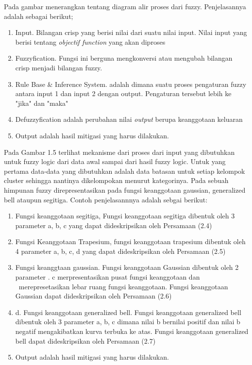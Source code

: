 \documentclass[11pt]{article}
\begin{document}
Pada gambar menerangkan tentang diagram alir proses dari fuzzy. Penjelasannya adalah sebagai berikut;
\begin{enumerate}[label=\alph*.]
	\item Input. Bilangan crisp yang berisi nilai dari suatu nilai input. Nilai input yang berisi tentang \textit{objectif function} yang akan diproses
	\item Fuzzyfication. Fungsi ini berguna mengkonversi atau mengubah bilangan crisp menjadi bilangan fuzzy.
	\item Rule Base \& Inference System. adalah dimana suatu proses pengaturan fuzzy antara input 1 dan input 2 dengan output. Pengaturan tersebut lebih ke "jika" dan "maka"
	\item Defuzzyfication adalah perubahan nilai \textit{output} berupa keanggotaan keluaran
	\item Output adalah hasil mitigasi yang harus dilakukan.
\end{enumerate}
Pada Gambar 1.5 terlihat mekanisme dari proses dari input yang dibutuhkan untuk fuzzy logic dari data awal sampai dari hasil fuzzy logic.
Untuk yang pertama data-data yang dibutuhkan adalah data batasan untuk setiap kelompok cluster sehingga nantinya dikelompokan menurut kategorinya.
Pada sebuah himpunan fuzzy  direpresentasikan pada fungsi keanggotaan gaussian, generalized bell ataupun segitiga.
Contoh penjelasannnya adalah sebgai berikut:
\begin{enumerate}[label=\alph*.]
	\item Fungsi keanggotaan segitiga, Fungsi  keanggotaan  segitiga dibentuk oleh 3 parameter  {a, b, c} yang dapat dideskripsikan oleh Persamaan (2.4)
	\item Fungsi Keanggotaan Trapesium, fungsi keanggotaan trapesium dibentuk oleh 4 parameter {a, b, c, d} yang dapat dideskripsikan oleh Persamaan (2.5)
	\item Fungsi keanggtaan gaussian. Fungsi  keanggotaan  Gaussian  dibentuk  oleh  2  parameter .	c merpresentasikan pusat fungsi keanggotaan dan \ merepresetasikan lebar ruang fungsi  keanggotaan.
	Fungsi  keanggotaan  Gaussian  dapat  dideskripsikan  oleh Persamaan (2.6)
	\item d. Fungsi keanggotaan generalized bell. Fungsi keanggotaan generalized bell dibentuk oleh 3 parameter {a, b, c} dimana nilai b bernilai positif dan nilai b negatif mengakibatkan kurva terbuka ke atas.  Fungsi  keanggotaan  generalized  bell  dapat  dideskripsikan  oleh  Persamaan (2.7)
	\item Output adalah hasil mitigasi yang harus dilakukan.
\end{enumerate}
\end{document}
